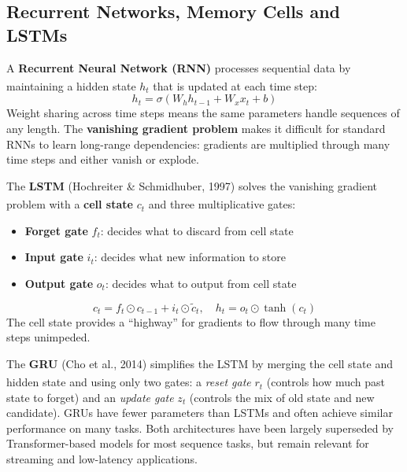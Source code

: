 \subsection{Recurrent Networks, Memory Cells and LSTMs}

\begin{tcbitemize}[ skin=sectionraster ]
    \tcbitem[title={Recurrent Neural Networks}, raster multicolumn=3]
    A \textbf{Recurrent Neural Network (RNN)} processes sequential data by maintaining a hidden state $h_t$ that is updated at each time step\textsuperscript{\cite[][pp.~55--58]{fleuretLittleBookDeep}}:
    \begin{equation}
        h_t = \sigma(W_h h_{t-1} + W_x x_t + b)
    \end{equation}
    Weight sharing across time steps means the same parameters handle sequences of any length.
    The \textbf{vanishing gradient problem} makes it difficult for standard RNNs to learn long-range dependencies: gradients are multiplied through many time steps and either vanish or explode.

    \tcbitem[title={LSTM: Long Short-Term Memory}, raster multicolumn=3]
    The \textbf{LSTM} (Hochreiter \& Schmidhuber, 1997) solves the vanishing gradient problem with a \textbf{cell state} $c_t$ and three multiplicative gates\textsuperscript{\cite[][pp.~59--61]{fleuretLittleBookDeep}}:
    \begin{itemize}
        \item \textbf{Forget gate} $f_t$: decides what to discard from cell state
        \item \textbf{Input gate} $i_t$: decides what new information to store
        \item \textbf{Output gate} $o_t$: decides what to output from cell state
    \end{itemize}
    \tcblower
    \begin{equation}
        c_t = f_t \odot c_{t-1} + i_t \odot \tilde{c}_t, \quad h_t = o_t \odot \tanh(c_t)
    \end{equation}
    The cell state provides a ``highway'' for gradients to flow through many time steps unimpeded.

    \tcbitem[title={GRU: Gated Recurrent Unit}, raster multicolumn=6]
    The \textbf{GRU} (Cho et al., 2014) simplifies the LSTM by merging the cell state and hidden state and using only two gates\textsuperscript{\cite[][p.~62]{fleuretLittleBookDeep}}:
    a \emph{reset gate} $r_t$ (controls how much past state to forget) and an \emph{update gate} $z_t$ (controls the mix of old state and new candidate).
    GRUs have fewer parameters than LSTMs and often achieve similar performance on many tasks.
    Both architectures have been largely superseded by Transformer-based models for most sequence tasks, but remain relevant for streaming and low-latency applications.
\end{tcbitemize}


